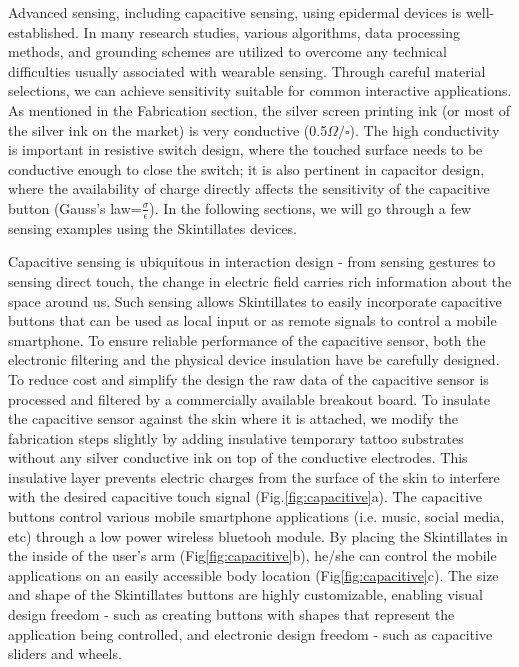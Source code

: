 \documentclass{sigchi}
\begin{document}
Advanced sensing, including capacitive sensing, using epidermal devices is well-established. In many research studies, various algorithms, data processing methods, and grounding schemes are utilized to overcome any technical difficulties usually associated with wearable sensing.  Through careful material selections, we can achieve sensitivity suitable for common interactive applications. As mentioned in the Fabrication section, the silver screen printing ink (or most of the silver ink on the market) is very conductive (0.5$\Omega/\square$). 
 The high conductivity is important in resistive switch design, where the touched surface needs to be conductive enough to close the switch; it is also pertinent in capacitor design, where the availability of charge directly affects the sensitivity of the capacitive button (Gauss’s law=$\frac{\sigma}{\epsilon}$). In the following sections, we will go through a few sensing examples using the Skintillates devices. 


Capacitive sensing is ubiquitous in interaction design - from sensing gestures to sensing direct touch, the change in electric field carries rich information about the space around us. Such sensing allows Skintillates to easily incorporate capacitive buttons that can be used as local input or as remote signals to control a mobile smartphone. To ensure reliable performance of the capacitive sensor, both the electronic filtering and the physical device insulation have be carefully designed. To reduce cost and simplify the design the raw data of the capacitive sensor is processed and filtered by a commercially available breakout board\footnotemark. To insulate the capacitive sensor against the skin where it is attached, we modify the fabrication steps slightly by adding insulative temporary tattoo substrates without any silver conductive ink on top of the conductive electrodes. This insulative layer prevents electric charges from the surface of the skin to interfere with the desired capacitive touch signal (Fig.\ref{fig:capacitive}a). The capacitive buttons control various mobile smartphone applications (i.e. music, social media, etc) through a low power wireless bluetooh module\footnotemark. By placing the Skintillates in the inside of the user’s arm (Fig\ref{fig:capacitive}b), he/she can control the mobile applications on an easily accessible body location (Fig\ref{fig:capacitive}c). The size and shape of the Skintillates buttons are highly customizable, enabling visual design freedom - such as creating buttons with shapes that represent the application being controlled, and electronic design freedom - such as capacitive sliders and wheels.
\end{document}
